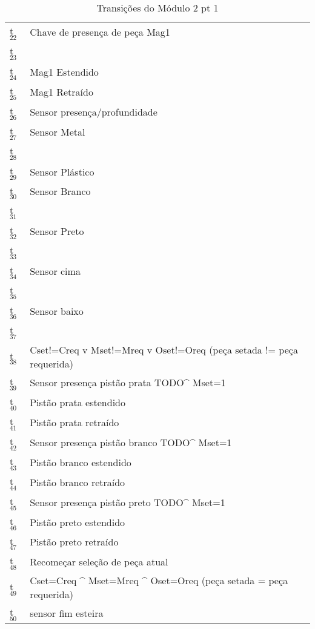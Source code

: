 \documentclass[11pt]{article}
\begin{document}
\begin{table}[htb]
\caption{Transições do Módulo 2 pt 1}
\centering
\begin{tabular}{ll}
t$_{\text{22}}$ & Chave de presença de peça Mag1\\
t$_{\text{23}}$ & \\
t$_{\text{24}}$ & Mag1 Estendido\\
t$_{\text{25}}$ & Mag1 Retraído\\
t$_{\text{26}}$ & Sensor presença/profundidade\\
t$_{\text{27}}$ & Sensor Metal\\
t$_{\text{28}}$ & \\
t$_{\text{29}}$ & Sensor Plástico\\
t$_{\text{30}}$ & Sensor Branco\\
t$_{\text{31}}$ & \\
t$_{\text{32}}$ & Sensor Preto\\
t$_{\text{33}}$ & \\
t$_{\text{34}}$ & Sensor cima\\
t$_{\text{35}}$ & \\
t$_{\text{36}}$ & Sensor baixo\\
t$_{\text{37}}$ & \\
t$_{\text{38}}$ & Cset!=Creq v Mset!=Mreq v Oset!=Oreq (peça setada != peça requerida)\\
t$_{\text{39}}$ & Sensor presença pistão prata TODO\^{} Mset=1\\
t$_{\text{40}}$ & Pistão prata estendido\\
t$_{\text{41}}$ & Pistão prata retraído\\
t$_{\text{42}}$ & Sensor presença pistão branco TODO\^{} Mset=1\\
t$_{\text{43}}$ & Pistão branco estendido\\
t$_{\text{44}}$ & Pistão branco retraído\\
t$_{\text{45}}$ & Sensor presença pistão preto TODO\^{} Mset=1\\
t$_{\text{46}}$ & Pistão preto estendido\\
t$_{\text{47}}$ & Pistão preto retraído\\
t$_{\text{48}}$ & Recomeçar seleção de peça atual\\
t$_{\text{49}}$ & Cset=Creq \^{} Mset=Mreq \^{} Oset=Oreq (peça setada = peça requerida)\\
t$_{\text{50}}$ & sensor fim esteira\\
\end{tabular}
\end{table}
\end{document}
